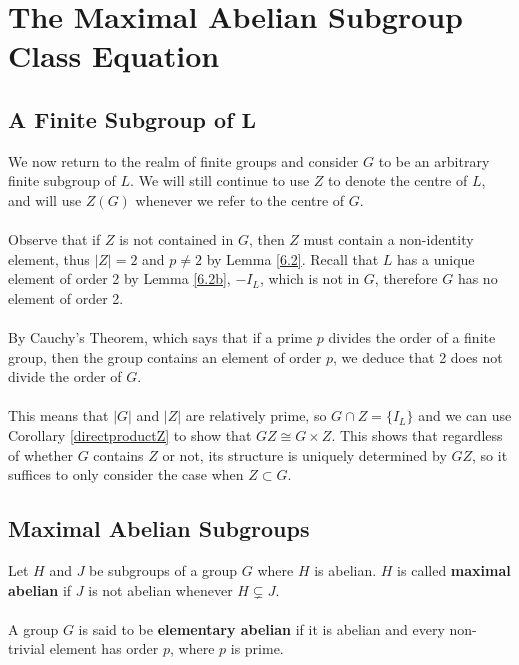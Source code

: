 \chapter[The Maximal Abelian Subgroup Class Equation]{The Maximal Abelian Subgroup Class Equation}

\section[A finite subgroup of $L$]{A Finite Subgroup of $\pmb{L}$}

We now return to the realm of finite groups and consider $G$ to be an arbitrary finite subgroup of $L$. We will still continue to use $Z$ to denote the centre of $L$, and will use $Z(G)$ whenever we refer to the centre of $G$. \\
\\
Observe that if $Z$ is not contained in $G$, then $Z$ must contain a non-identity element, thus $|Z| = 2$ and $p \neq 2$ by Lemma \ref{6.2}. Recall that $L$ has a unique element of order 2 by Lemma \ref{6.2b}, $- I_L$, which is not in $G$, therefore $G$ has no element of order 2. \\
\\
By Cauchy's Theorem, which says that if a prime $p$ divides the order of a finite group, then the group contains an element of order $p$, we deduce that 2 does not divide the order of $G$. \\
\\
This means that $|G|$ and $|Z|$ are relatively prime, so $G \cap Z = \{ I_L \}$ and we can use Corollary \ref{directproductZ} to show that $GZ \cong G \times Z$. This shows that regardless of whether $G$ contains $Z$ or not, its structure is uniquely determined by $GZ$, so it suffices to only consider the case when $Z \subset G$. 

\section{Maximal Abelian Subgroups}

\begin{definition} Let $H$ and $J$ be subgroups of a group $G$ where $H$ is abelian. $H$ is called \textbf{maximal abelian} if $J$ is not abelian whenever $H \subsetneq J$. \\
\\
A group $G$ is said to be \textbf{elementary abelian} if it is abelian and every non-trivial element has order $p$, where $p$ is prime.
\end{definition}

